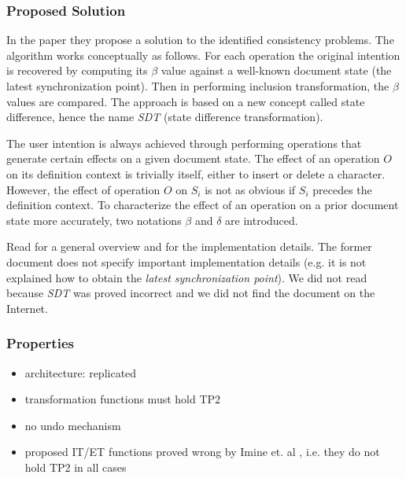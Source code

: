 \subsubsection{Proposed Solution}
In the paper \cite{sdt} they propose a solution to the identified consistency problems. The algorithm works conceptually as follows. For each operation the original intention is recovered by computing its $\beta$ value against a well-known document state (the latest synchronization point). Then in performing inclusion transformation, the $\beta$ values are compared. The approach is based on a new concept called state difference, hence the name \emph{SDT} (state difference transformation).

The user intention is always achieved through performing operations that generate certain effects on a given document state. The effect of an operation $O$ on its definition context is trivially itself, either to insert or delete a character. However, the effect of operation $O$ on $S_{i}$ is not as obvious if $S_{i}$ precedes the definition context. To characterize the effect of an operation on a prior document state more accurately, two notations $\beta$ and $\delta$ are introduced.

Read \cite{sdt} for a general overview and \cite{li03} for the implementation details. The former document does not specify important implementation details (e.g. it is not explained how to obtain the \emph{latest synchronization point}). We did not read \cite{li03} because \emph{SDT} was proved incorrect \cite{imine04} and we did not find the document on the Internet.


\subsubsection{Properties}
\begin{itemize}
 \item architecture: replicated
 \item transformation functions must hold TP2
 \item no undo mechanism
 \item proposed IT/ET functions proved wrong by Imine et. al \cite{imine04}, 
       i.e. they do not hold TP2 in all cases
\end{itemize}



